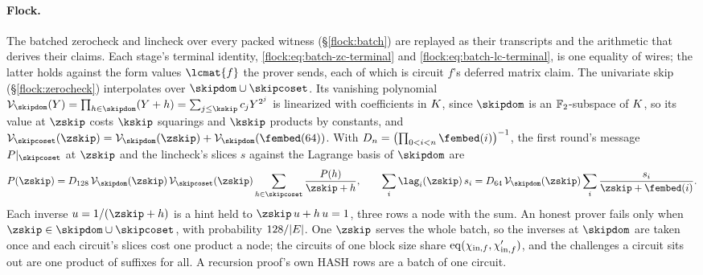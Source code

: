 \paragraph{Flock.} The batched zerocheck and lincheck over every packed witness (\S\ref{flock:batch}) are replayed as their transcripts and the arithmetic that derives their claims. Each stage's terminal identity, \eqref{flock:eq:batch-zc-terminal} and \eqref{flock:eq:batch-lc-terminal}, is one equality of wires; the latter holds against the form values $\lcmat{f}$ the prover sends, each of which is circuit $f$'s deferred matrix claim. The univariate skip (\S\ref{flock:zerocheck}) interpolates over $\skipdom\cup\skipcoset$. Its vanishing polynomial $\vansub_{\skipdom}(Y)=\prod_{h\in\skipdom}(Y+h)=\sum_{j\le\kskip}c_jY^{2^j}$ is linearized with coefficients in $K$, since $\skipdom$ is an $\mathbb{F}_2$-subspace of $K$, so its value at $\zskip$ costs $\kskip$ squarings and $\kskip$ products by constants, and $\vansub_{\skipcoset}(\zskip)=\vansub_{\skipdom}(\zskip)+\vansub_{\skipdom}(\fembed(64))$. With $D_n=\bigl(\prod_{0<i<n}\fembed(i)\bigr)^{-1}$, the first round's message $P|_{\skipcoset}$ at $\zskip$ and the lincheck's slices $s$ against the Lagrange basis of $\skipdom$ are
\[
  P(\zskip)=D_{128}\,\vansub_{\skipdom}(\zskip)\,\vansub_{\skipcoset}(\zskip)\sum_{h\in\skipcoset}\frac{P(h)}{\zskip+h},\qquad
  \sum_i\lag_i(\zskip)\,s_i=D_{64}\,\vansub_{\skipdom}(\zskip)\sum_{i}\frac{s_i}{\zskip+\fembed(i)}.
\]
Each inverse $u=1/(\zskip+h)$ is a hint held to $\zskip\,u+h\,u=1$, three rows a node with the sum. An honest prover fails only when $\zskip\in\skipdom\cup\skipcoset$, with probability $128/|E|$. One $\zskip$ serves the whole batch, so the inverses at $\skipdom$ are taken once and each circuit's slices cost one product a node; the circuits of one block size share $\operatorname{eq}(\chi_{\mathrm{in},f},\chi'_{\mathrm{in},f})$, and the challenges a circuit sits out are one product of suffixes for all. A recursion proof's own \textsf{HASH} rows are a batch of one circuit.

